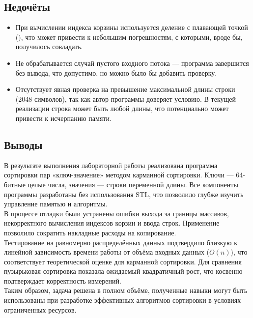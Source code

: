 \documentclass[12pt]{article}
\begin{document}
\subsection*{Недочёты}

\begin{itemize}
\item При вычислении индекса корзины используется деление с плавающей точкой (), что может привести к небольшим погрешностям, с которыми, вроде бы, получилось совладать.
\item Не обрабатывается случай пустого входного потока — программа завершится без вывода, что допустимо, но можно было бы добавить проверку.
\item Отсутствует явная проверка на превышение максимальной длины строки (2048 символов), так как автор программы доверяет условию. В текущей реализации строка может быть любой длины, что потенциально может привести к исчерпанию памяти.
\end{itemize}

\subsection*{Выводы}
\hspace{2ex}
В результате выполнения лабораторной работы реализована программа сортировки пар «ключ-значение» методом карманной сортировки. Ключи — 64-битные целые числа, значения — строки переменной длины. Все компоненты программы разработаны без использования STL, что позволило глубже изучить управление памятью и алгоритмы. \\

В процессе отладки были устранены ошибки выхода за границы массивов, некорректного вычисления индексов корзин и ввода строк. Применение  позволило сократить накладные расходы на копирование. \\

Тестирование на равномерно распределённых данных подтвердило близкую к линейной зависимость времени работы от объёма входных данных ($O(n)$), что соответствует теоретической оценке для карманной сортировки. Для сравнения пузырьковая сортировка показала ожидаемый квадратичный рост, что косвенно подтверждает корректность измерений. \\

Таким образом, задача решена в полном объёме, полученные навыки могут быть использованы при разработке эффективных алгоритмов сортировки в условиях ограниченных ресурсов. \\
\end{document}
